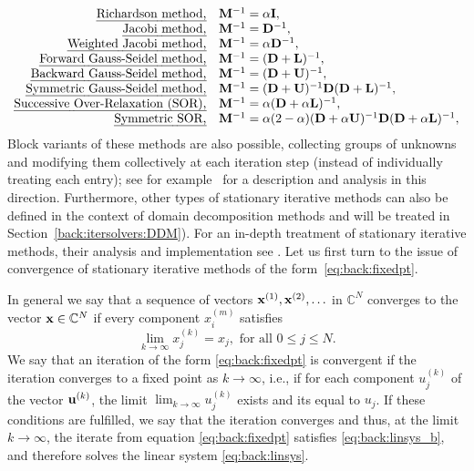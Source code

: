\begin{equation*}
\begin{array}{rl}
\text{\emph{Richardson method,}} & \mathbf{M}^{-1}=\alpha\mathbf{I}, \\
\text{\emph{Jacobi method,}} & \mathbf{M}^{-1}=\mathbf{D}^{-1}, \\
\text{\emph{Weighted Jacobi method,}} & \mathbf{M}^{-1}=\alpha\mathbf{D}^{-1}, \\
\text{\emph{Forward Gauss-Seidel method,}} & \mathbf{M}^{-1}=(\mathbf{D}+\mathbf{L})^{-1}, \\
\text{\emph{Backward Gauss-Seidel method,}} & \mathbf{M}^{-1}=(\mathbf{D}+\mathbf{U})^{-1},\\
\text{\emph{Symmetric Gauss-Seidel method,}} & \mathbf{M}^{-1}=(\mathbf{D}+\mathbf{U})^{-1}\mathbf{D}(\mathbf{D}+\mathbf{L})^{-1},\\
\text{\emph{Successive Over-Relaxation (SOR),}} & \mathbf{M}^{-1}=\alpha(\mathbf{D}+\alpha\mathbf{L})^{-1},\\
\text{\emph{Symmetric SOR,}} & \mathbf{M}^{-1}=\alpha(2-\alpha)(\mathbf{D}+\alpha\mathbf{U})^{-1}\mathbf{D}(\mathbf{D}+\alpha\mathbf{L})^{-1},\\
\end{array}
\end{equation*}
Block variants of these methods are also possible, collecting groups of unknowns and modifying them collectively at each iteration step (instead of individually treating each entry); see for example~\cite{Saa03} for a description and analysis in this direction. Furthermore, other types of stationary iterative methods can also be defined in the context of domain decomposition methods and will be treated in Section~\ref{back:itersolvers:DDM}). For an in-depth treatment of stationary iterative methods, their analysis and implementation see \cite{Var09}. Let us first turn to the issue of convergence of stationary iterative methods of the form~\eqref{eq:back:fixedpt}.

In general we say that a sequence of vectors $\mathbf{x}^{(1)},\mathbf{x}^{(2)},\ldots$ in $\mathbb{C}^{N}$ converges to the vector $\mathbf{x}\in\mathbb{C}^{N}$ if every component $x_{i}^{(m)}$ satisfies
\begin{equation*}
\lim_{k\to\infty}x_{j}^{(k)}=x_j,\text{ for all } 0\leq j\leq N.
\end{equation*}
We say that an iteration of the form \eqref{eq:back:fixedpt} is convergent if the iteration converges to a fixed point as $k\to \infty$, i.e., if for each component $u_j^{(k)}$ of the vector $\mathbf{u}^{(k)}$, the limit
$\lim_{k\to\infty}u_j^{(k)}$ exists and its equal to $u_j$.
If these conditions are fulfilled, we say that the iteration converges and thus, at the limit $k\to\infty$, the iterate from equation \eqref{eq:back:fixedpt} satisfies \eqref{eq:back:linsys_b}, and therefore solves the linear system \eqref{eq:back:linsys}.


